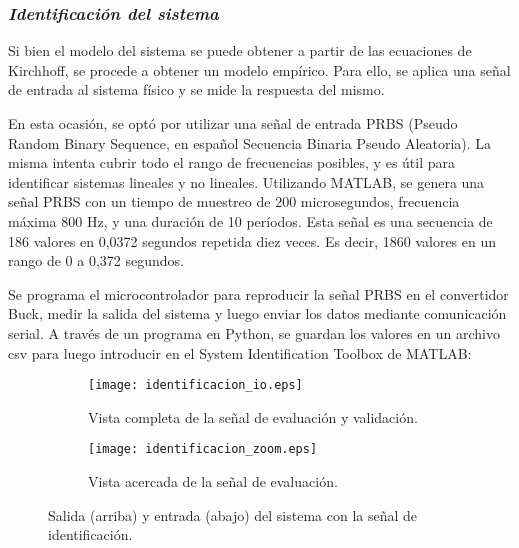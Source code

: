\subsubsection*{\it{Identificación del sistema}}
\vspace{-0.25cm}
Si bien el modelo del sistema se puede obtener a partir de las ecuaciones de Kirchhoff, se procede
a obtener un modelo empírico. Para ello, se aplica una señal de entrada al sistema físico y se
mide la respuesta del mismo.

En esta ocasión, se optó por utilizar una señal de entrada PRBS
(Pseudo Random Binary Sequence, en español Secuencia Binaria Pseudo Aleatoria). La misma intenta
cubrir todo el rango de frecuencias posibles, y es útil para identificar sistemas lineales y no lineales.
Utilizando MATLAB, se genera una señal PRBS con un tiempo de muestreo de 200 microsegundos, frecuencia máxima
800 Hz, y una duración de 10 períodos. Esta señal es una secuencia de 186 valores en 0,0372 segundos repetida diez veces.
Es decir, 1860 valores en un rango de 0 a 0,372 segundos.

Se programa el microcontrolador para reproducir la señal PRBS en el convertidor Buck, medir la salida
del sistema y luego enviar los datos mediante comunicación serial. A través de un programa en Python, se guardan
los valores en un archivo csv para luego introducir en el System Identification Toolbox de MATLAB:


\begin{figure}[H]
    \centering

    \begin{subfigure}[b]{\textwidth}
        \centering
        \texttt{[image: identificacion\_io.eps]}
        \caption{Vista completa de la señal de evaluación y validación.}
        \label{fig:identificacion_io_gral}
    \end{subfigure}
    \begin{subfigure}[b]{\textwidth}
        \centering
        \texttt{[image: identificacion\_zoom.eps]}
        \caption{Vista acercada de la señal de evaluación.}
        \label{fig:identificacion_io_zoom}
    \end{subfigure}

    \vspace{-0.25cm}
    \caption{Salida (arriba) y entrada (abajo) del sistema con la señal de identificación.}
    \label{fig:identificacion_io}
\end{figure}
\vspace{-0.5cm}


